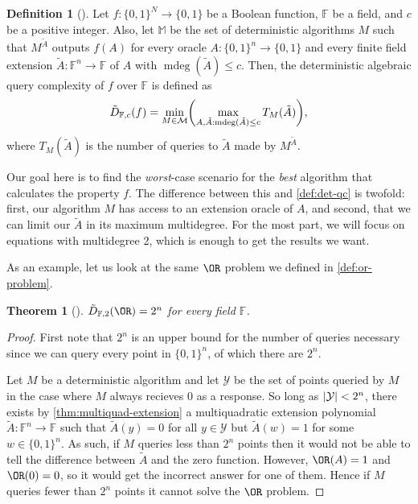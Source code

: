 \documentclass[english]{reedthesis}
\theoremstyle{plain}
\newtheorem{thm}{Theorem}[section]
\theoremstyle{definition}
\newtheorem{defn}[defn]{Definition}
\theoremstyle{remark}
\DeclareMathOperator{\mdeg}{mdeg}
\DeclarePairedDelimiter{\abs}{\lvert}{\rvert}
\begin{document}
\begin{defn}[{\cite[Def. 4.1]{AW09}}]\label{def:aqc}
  Let $f: \{0, 1\}^{N} \rightarrow \{0, 1\}$ be a Boolean function, $\mathbb{F}$ be a
  field, and $c$ be a positive integer. Also, let $\mathbb{M}$ be the set of
  deterministic algorithms $M$ such that $M^{\tilde{A}}$ outputs $f(A)$ for
  every oracle $A: \{0, 1\}^{n} \rightarrow \{0, 1\}$ and every finite field extension
  $\tilde{A}: \mathbb{F}^{n} \rightarrow \mathbb{F}$ of $A$ with $\mdeg(\tilde{A}) \le c$.
  Then, the deterministic algebraic query complexity of $f$ over $\mathbb{F}$ is
  defined as
  \begin{equation}
    \tilde{D}_{\mathbb{F}, c}(f) = \min_{M \in \mathcal{M}}\mleft(
      \max_{A, \tilde{A}: \mdeg(\tilde{A}) \le c}T_{M}(\tilde{A})
    \mright),
  \end{equation}
  where $T_{M}(\tilde{A})$ is the number of queries to $\tilde{A}$ made by
  $M^{\tilde{A}}$.
\end{defn}

Our goal here is to find the \emph{worst}-case scenario for the \emph{best}
algorithm that calculates the property $f$. The difference between this and
\cref{def:det-qc} is twofold: first, our algorithm $M$ has access to
an extension oracle of $A$, and second, that we can limit our $\tilde{A}$ in
its maximum multidegree. For the most part, we will focus on equations with
multidegree 2, which is enough to get the results we want.

As an example, let us look at the same $\OR$ problem we defined in
\cref{def:or-problem}.

\begin{thm}[{\cite[Thm.\ 4.4]{AW09}}]\label{thm:or-algebraic}
  $\tilde{D}_{\mathbb{F},2}(\OR) = 2^{n}$ for every field $\mathbb{F}$.
\end{thm}

\begin{proof}
  First note that $2^{n}$ is an upper bound for the number of queries necessary
  since we can query every point in $\{0, 1\}^{n}$, of which there are $2^{n}$.

  Let $M$ be a deterministic algorithm and let $\mathcal{Y}$ be the set of points queried
  by $M$ in the case where $M$ always recieves $0$ as a response. So long as
  $\abs{\mathcal{Y}} < 2^{n}$, there exists by \cref{thm:multiquad-extension} a
  multiquadratic extension polynomial $\tilde{A}: \mathbb{F}^{n} \rightarrow \mathbb{F}$
  such that $\tilde{A}(y) = 0$ for all $y \in \mathcal{Y}$ but $\tilde{A}(w) = 1$ for some
  $w \in \{0, 1\}^{n}$. As such, if $M$ queries less than $2^{n}$ points then it
  would not be able to tell the difference between $\tilde{A}$ and the zero
  function. However, $\OR(A) = 1$ and $\OR(0) = 0$, so it would get the
  incorrect answer for one of them. Hence if $M$ queries fewer than $2^{n}$
  points it cannot solve the $\OR$ problem.
\end{proof}
\end{document}
